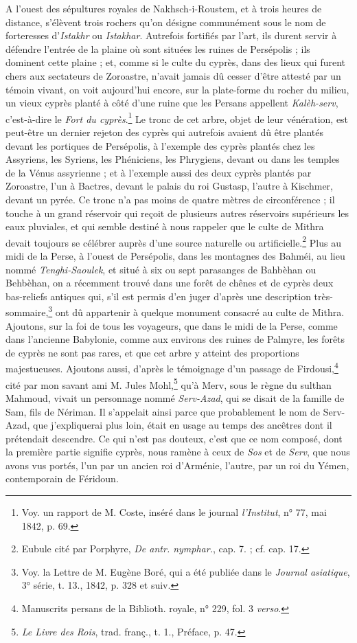 \documentclass[a4paper, 11pt, oneside, polutonikogreek, french]{article}
\begin{document}
A l'ouest des sépultures royales de Nakhsch-i-Roustem, et à trois heures de distance, s'élèvent trois rochers qu'on désigne communément sous le nom de forteresses d'\emph{Istakhr} ou \emph{Istakhar}. Autrefois fortifiés par l'art, ils durent servir à défendre l'entrée de la plaine où sont situées les ruines de Persépolis ; ils dominent cette plaine ; et, comme si le culte du cyprès, dans des lieux qui furent chers aux sectateurs de Zoroastre, n'avait jamais dû cesser d'être attesté par un témoin vivant, on voit aujourd'hui encore, sur la plate-forme du rocher du milieu, un vieux cyprès planté à côté d'une ruine que les Persans appellent \emph{Kalèh-serv}, c'est-à-dire le \emph{Fort du cyprès}.\footnote{Voy. un rapport de M. Coste, inséré dans le journal \emph{l'Institut}, n° 77, mai 1842, p. 69.} Le tronc de cet arbre, objet de leur vénération, est peut-être un dernier rejeton des cyprès qui autrefois avaient dû être plantés devant les portiques de Persépolis, à l'exemple des cyprès plantés chez les Assyriens, les Syriens, les Phéniciens, les Phrygiens, devant ou dans les temples de la Vénus assyrienne ; et à l'exemple aussi des deux cyprès plantés par Zoroastre, l'un à Bactres, devant le palais du roi Gustasp, l'autre à Kischmer, devant un pyrée. Ce tronc n'a pas moins de quatre mètres de circonférence ; il touche à un grand réservoir qui reçoit de plusieurs autres réservoirs supérieurs les eaux pluviales, et qui semble destiné à nous rappeler que le culte de Mithra devait toujours se célébrer auprès d'une source naturelle ou artificielle.\footnote{Eubule cité par Porphyre, \emph{De antr. nymphar.}, cap. 7. ; cf. cap. 17.} Plus au midi de la Perse, à l'ouest de Persépolis, dans les montagnes des Bahméi, au lieu nommé \emph{Tenghi-Saoulek}, et situé à six ou sept parasanges de Bahbèhan ou Behbèhan, on a récemment trouvé dans une forêt de chênes et de cyprès deux bas-reliefs antiques qui, s'il est permis d'en juger d'après une description très-sommaire,\footnote{Voy. la Lettre de M. Eugène Boré, qui a été publiée dans le \emph{Journal asiatique}, 3° série, t. 13., 1842, p. 328 et suiv.} ont dû appartenir à quelque monument consacré au culte de Mithra. Ajoutons, sur la foi de tous les voyageurs, que dans le midi de la Perse, comme dans l'ancienne Babylonie, comme aux environs des ruines de Palmyre, les forêts de cyprès ne sont pas rares, et que cet arbre y atteint des proportions majestueuses. Ajoutons aussi, d'après le témoignage d'un passage de Firdousi,\footnote{Manuscrits persans de la Biblioth. royale, n° 229, fol. 3 \emph{verso}.} cité par mon savant ami M. Jules Mohl,\footnote{\emph{Le Livre des Rois}, trad. franç., t. 1., Préface, p. 47.} qu'à Merv, sous le règne du sulthan Mahmoud, vivait un personnage nommé \emph{Serv-Azad}, qui se disait de la famille de Sam, fils de Nériman. Il s'appelait ainsi parce que probablement le nom de Serv-Azad, que j'expliquerai plus loin, était en usage au temps des ancêtres dont il prétendait descendre. Ce qui n'est pas douteux, c'est que ce nom composé, dont la première partie signifie cyprès, nous ramène à ceux de \emph{Sos} et de \emph{Serv}, que nous avons vus portés, l'un par un ancien roi d'Arménie, l'autre, par un roi du Yémen, contemporain de Féridoun.
\end{document}
